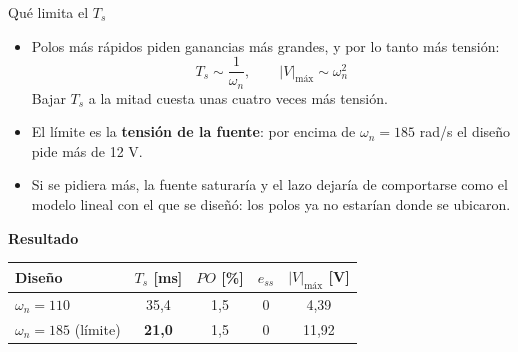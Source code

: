 \documentclass[11pt,aspectratio=169]{beamer}
\begin{document}
\begin{frame}{Qué limita el $T_s$}
  \begin{itemize}
    \item Polos más rápidos piden ganancias más grandes, y por lo tanto más tensión:
          \[
            T_s \sim \frac{1}{\omega_n},\qquad |V|_{\text{máx}} \sim \omega_n^2
          \]
          Bajar $T_s$ a la mitad cuesta unas cuatro veces más tensión.
    \item El límite es la \textbf{tensión de la fuente}: por encima de $\omega_n = 185$ rad/s
          el diseño pide más de 12 V.
    \item Si se pidiera más, la fuente saturaría y el lazo dejaría de comportarse como el modelo lineal
          con el que se diseñó: los polos ya no estarían donde se ubicaron.
  \end{itemize}

  \vspace{0.8em}
  \textbf{Resultado}
  \begin{center}
    \begin{tabular}{lcccc}
      \toprule
      Diseño & $T_s$ [ms] & $PO$ [\%] & $e_{ss}$ & $|V|_{\text{máx}}$ [V]\\
      \midrule
      $\omega_n = 110$ & 35,4 & 1,5 & 0 & 4,39\\
      $\omega_n = 185$ (límite) & \textbf{21,0} & 1,5 & 0 & 11,92\\
      \bottomrule
    \end{tabular}
  \end{center}
\end{frame}
\end{document}
